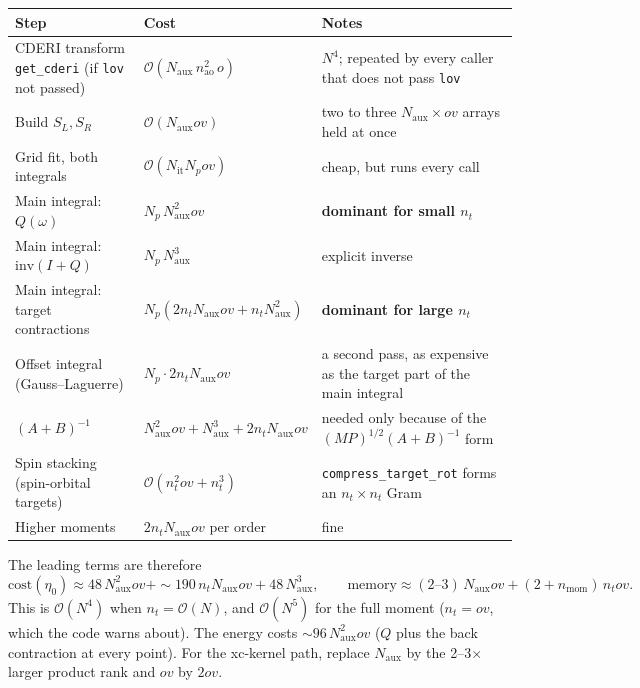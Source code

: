 \documentclass[11pt,a4paper]{article}
\newcommand{\code}[1]{\texttt{\small #1}}
\newcommand{\Naux}{N_{\mathrm{aux}}}
\newcommand{\nt}{n_{t}}
\newcommand{\Np}{N_{p}}
\newcommand{\ov}{ov}
\begin{document}
\begin{center}
\small
\begin{tabularx}{\textwidth}{@{}>{\raggedright\arraybackslash}p{5.0cm}>{\raggedright\arraybackslash}p{4.4cm}L@{}}
\toprule
Step & Cost & Notes \\
\midrule
CDERI transform \code{get\_cderi} (if \code{lov} not passed) & $\mathcal{O}(\Naux\,n_{\mathrm{ao}}^2\,o)$
  & $N^4$; repeated by every caller that does not pass \code{lov} \\
Build $S_L,S_R$ & $\mathcal{O}(\Naux\ov)$ & two to three $\Naux\times\ov$ arrays held at once \\
Grid fit, both integrals & $\mathcal{O}(N_{\mathrm{it}}\Np\ov)$ & cheap, but runs every call \\
Main integral: $Q(\omega)$ & $\Np\,\Naux^2\ov$ & \textbf{dominant for small $\nt$} \\
Main integral: $\mathrm{inv}(I+Q)$ & $\Np\,\Naux^3$ & explicit inverse \\
Main integral: target contractions & $\Np(2\nt\Naux\ov + \nt\Naux^2)$ & \textbf{dominant for large $\nt$} \\
Offset integral (Gauss--Laguerre) & $\Np\cdot 2\nt\Naux\ov$
  & a second pass, as expensive as the target part of the main integral \\
$(A+B)^{-1}$ & $\Naux^2\ov + \Naux^3 + 2\nt\Naux\ov$
  & needed only because of the $(MP)^{1/2}(A+B)^{-1}$ form \\
Spin stacking (spin-orbital targets) & $\mathcal{O}(\nt^2\ov + \nt^3)$
  & \code{compress\_target\_rot} forms an $\nt\times\nt$ Gram \\
Higher moments & $2\nt\Naux\ov$ per order & fine \\
\bottomrule
\end{tabularx}
\end{center}

\noindent The leading terms are therefore
\begin{equation}
  \text{cost}(\eta_0) \approx 48\,\Naux^2\ov + {\sim}190\,\nt\Naux\ov + 48\,\Naux^3,
  \qquad
  \text{memory} \approx (2\text{--}3)\,\Naux\ov + (2+n_{\mathrm{mom}})\,\nt\ov .
\end{equation}
This is $\mathcal{O}(N^4)$ when $\nt=\mathcal{O}(N)$, and $\mathcal{O}(N^5)$ for the full
moment ($\nt=\ov$, which the code warns about). The energy costs ${\sim}96\,\Naux^2\ov$
($Q$ plus the back contraction at every point). For the xc-kernel path, replace $\Naux$ by
the 2--3$\times$ larger product rank and $\ov$ by $2\ov$.
\end{document}
